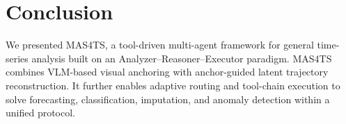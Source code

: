 \section{Conclusion}
We presented MAS4TS, a tool-driven multi-agent framework for general time-series analysis built on an Analyzer--Reasoner--Executor paradigm. MAS4TS combines VLM-based visual anchoring with anchor-guided latent trajectory reconstruction. It further enables adaptive routing and tool-chain execution to solve forecasting, classification, imputation, and anomaly detection within a unified protocol.